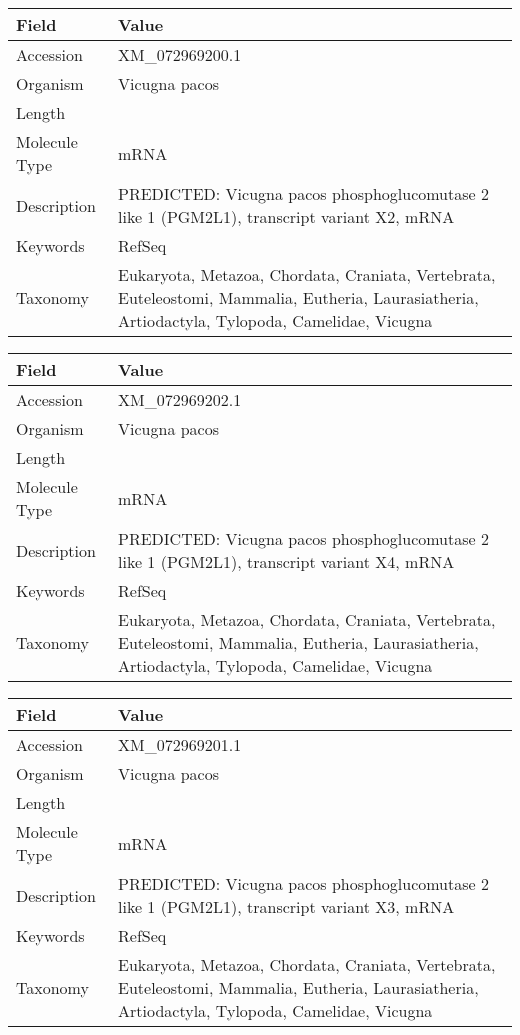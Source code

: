 \documentclass[10pt]{article}
\begin{document}
{\footnotesize
\begin{longtable}{>{\raggedright\arraybackslash}p{4.5cm} >{\raggedright\arraybackslash}p{11.5cm}}
\textbf{Field} & \textbf{Value} \\
\hline
Accession & XM\_072969200.1 \\
Organism & Vicugna pacos \\
Length & 3451 \\
Molecule Type & mRNA \\
Description & PREDICTED: Vicugna pacos phosphoglucomutase 2 like 1 (PGM2L1), transcript variant X2, mRNA \\
Keywords & RefSeq \\
Taxonomy & Eukaryota, Metazoa, Chordata, Craniata, Vertebrata, Euteleostomi, Mammalia, Eutheria, Laurasiatheria, Artiodactyla, Tylopoda, Camelidae, Vicugna \\
\end{longtable}
}

{\footnotesize
\begin{longtable}{>{\raggedright\arraybackslash}p{4.5cm} >{\raggedright\arraybackslash}p{11.5cm}}
\textbf{Field} & \textbf{Value} \\
\hline
Accession & XM\_072969202.1 \\
Organism & Vicugna pacos \\
Length & 2190 \\
Molecule Type & mRNA \\
Description & PREDICTED: Vicugna pacos phosphoglucomutase 2 like 1 (PGM2L1), transcript variant X4, mRNA \\
Keywords & RefSeq \\
Taxonomy & Eukaryota, Metazoa, Chordata, Craniata, Vertebrata, Euteleostomi, Mammalia, Eutheria, Laurasiatheria, Artiodactyla, Tylopoda, Camelidae, Vicugna \\
\end{longtable}
}

{\footnotesize
\begin{longtable}{>{\raggedright\arraybackslash}p{4.5cm} >{\raggedright\arraybackslash}p{11.5cm}}
\textbf{Field} & \textbf{Value} \\
\hline
Accession & XM\_072969201.1 \\
Organism & Vicugna pacos \\
Length & 2433 \\
Molecule Type & mRNA \\
Description & PREDICTED: Vicugna pacos phosphoglucomutase 2 like 1 (PGM2L1), transcript variant X3, mRNA \\
Keywords & RefSeq \\
Taxonomy & Eukaryota, Metazoa, Chordata, Craniata, Vertebrata, Euteleostomi, Mammalia, Eutheria, Laurasiatheria, Artiodactyla, Tylopoda, Camelidae, Vicugna \\
\end{longtable}
}
\end{document}
